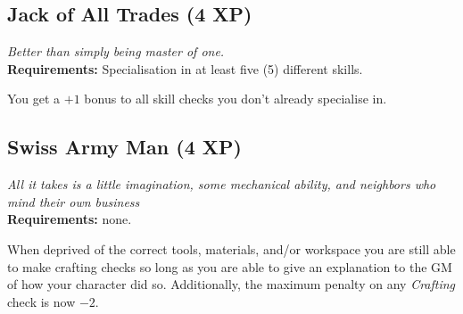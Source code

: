 \subsection{Jack of All Trades (4 XP)}
\textit{Better than simply being master of one.}\\
\textbf{Requirements:} Specialisation in at least five (5) different skills.

You get a $+1$ bonus to all skill checks you don't already specialise in.

\subsection{Swiss Army Man (4 XP)}
\textit{All it takes is a little imagination, some mechanical ability, and neighbors who mind their own business}\\
\textbf{Requirements:} none.

When deprived of the correct tools, materials, and/or workspace you are still able to make crafting checks so long as you are able to give an explanation to the GM of how your character did so.
Additionally, the maximum penalty on any \textit{Crafting} check is now $-2$.